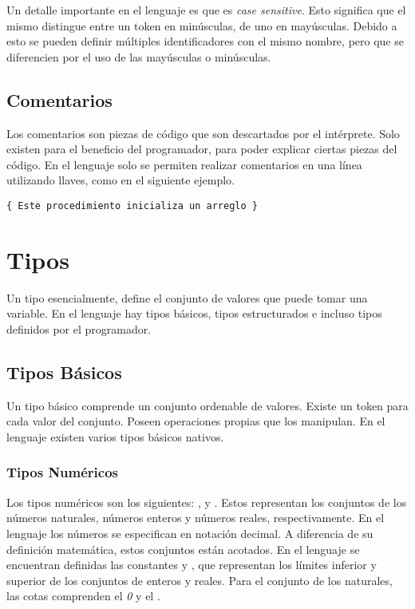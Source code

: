 \documentclass{article}
\begin{document}
Un detalle importante en el lenguaje es que \Lang\space es \textit{case sensitive}.
Esto significa que el mismo distingue entre un token en minúsculas, de uno en mayúsculas.
Debido a esto se pueden definir múltiples identificadores con el mismo nombre, pero que se diferencien por el uso de las mayúsculas o minúsculas.

\subsection{Comentarios}

Los comentarios son piezas de código que son descartados por el intérprete.
Solo existen para el beneficio del programador, para poder explicar ciertas piezas del código.
En el lenguaje solo se permiten realizar comentarios en una línea utilizando llaves, como en el siguiente ejemplo.

\begin{lstlisting}
{ Este procedimiento inicializa un arreglo }
\end{lstlisting}

\section{Tipos}

Un tipo esencialmente, define el conjunto de valores que puede tomar una variable.
En el lenguaje hay tipos básicos, tipos estructurados e incluso tipos definidos por el programador.

\subsection{Tipos Básicos}

Un tipo básico comprende un conjunto ordenable de valores.
Existe un token para cada valor del conjunto.
Poseen operaciones propias que los manipulan.
En el lenguaje existen varios tipos básicos nativos.

\subsubsection{Tipos Numéricos}

Los tipos numéricos son los siguientes: ,  y .
Estos representan los conjuntos de los números naturales, números enteros y números reales, respectivamente.
En el lenguaje los números se especifican en notación decimal.
A diferencia de su definición matemática, estos conjuntos están acotados.
En el lenguaje se encuentran definidas las constantes \ninf\space y \pinf, que representan los límites inferior y superior de los conjuntos de enteros y reales.
Para el conjunto de los naturales, las cotas comprenden el \textit{0} y el \pinf.
\end{document}

